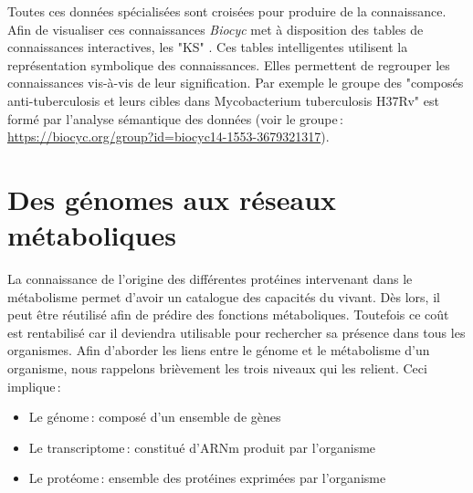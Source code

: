 \begin{refsegment}
    
    Toutes ces données spécialisées sont croisées pour produire de la connaissance. Afin de visualiser ces connaissances \textit{Biocyc} met à disposition des tables de connaissances interactives, les "\acrfull{KS}" \cite{bat061SmartTable}. Ces tables intelligentes utilisent la représentation symbolique des connaissances. Elles permettent de regrouper les connaissances vis-à-vis de leur signification. Par exemple le groupe des "composés anti-tuberculosis  et leurs cibles dans  Mycobacterium tuberculosis H37Rv" est formé par l'analyse sémantique des données (voir le groupe : \url{https://biocyc.org/group?id=biocyc14-1553-3679321317}).
    
    
    
    
    \section{Des génomes aux réseaux métaboliques}
    
    La connaissance de l'origine des différentes protéines intervenant dans le métabolisme permet d'avoir un catalogue des capacités du vivant. Dès lors, il peut être réutilisé afin de prédire des fonctions métaboliques. Toutefois ce coût est rentabilisé car il deviendra utilisable pour rechercher sa présence dans tous les organismes. Afin d'aborder les liens entre le génome et le métabolisme d'un organisme, nous rappelons brièvement les trois niveaux qui les relient. Ceci implique :
    
    \begin{itemize}
        \item Le génome : composé d'un ensemble de gènes
        \item Le transcriptome : constitué d'\acrfull{ARNm} produit par l'organisme
        \item Le protéome : ensemble des protéines exprimées par l'organisme
    \end{itemize}
    

\end{refsegment}
